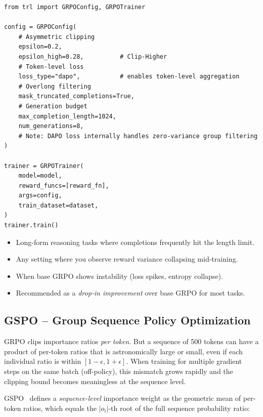 \begin{examplebox}
\begin{lstlisting}[style=pythonstyle]
from trl import GRPOConfig, GRPOTrainer

config = GRPOConfig(
    # Asymmetric clipping
    epsilon=0.2,
    epsilon_high=0.28,          # Clip-Higher
    # Token-level loss
    loss_type="dapo",           # enables token-level aggregation
    # Overlong filtering
    mask_truncated_completions=True,
    # Generation budget
    max_completion_length=1024,
    num_generations=8,
    # Note: DAPO loss internally handles zero-variance group filtering
)

trainer = GRPOTrainer(
    model=model,
    reward_funcs=[reward_fn],
    args=config,
    train_dataset=dataset,
)
trainer.train()
\end{lstlisting}
\end{examplebox}

\begin{keybox}
\begin{itemize}
  \item Long-form reasoning tasks where completions frequently hit the length limit.
  \item Any setting where you observe reward variance collapsing mid-training.
  \item When base GRPO shows instability (loss spikes, entropy collapse).
  \item Recommended as a \emph{drop-in improvement} over base GRPO for most tasks.
\end{itemize}
\end{keybox}

\subsection{GSPO -- Group Sequence Policy Optimization}
\label{sec:gspo}

\begin{intuitionbox}
GRPO clips importance ratios \emph{per token}. But a sequence of 500 tokens can have a product of per-token ratios that is astronomically large or small, even if each individual ratio is within $[1-\epsilon, 1+\epsilon]$. When training for multiple gradient steps on the same batch (off-policy), this mismatch grows rapidly and the clipping bound becomes meaningless at the sequence level.
\end{intuitionbox}

GSPO~\cite{chen2025gspo} defines a \emph{sequence-level} importance weight as the geometric mean of per-token ratios, which equals the $|o_i|$-th root of the full sequence probability ratio:

